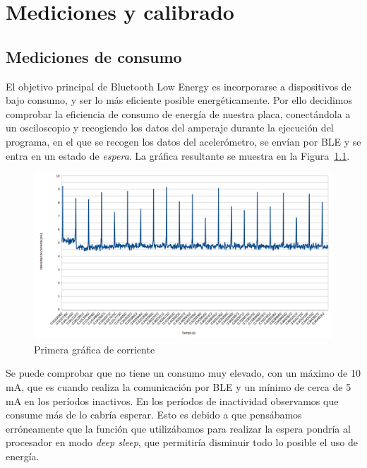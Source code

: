 \cleardoublepage

\chapter{Mediciones y calibrado}
\label{makereference7}

\section{Mediciones de consumo}

El objetivo principal de Bluetooth Low Energy es incorporarse a dispositivos de bajo consumo, y ser lo más eficiente posible energéticamente. Por ello decidimos comprobar la eficiencia de consumo de energía de nuestra placa, conectándola a un osciloscopio y recogiendo los datos del amperaje durante la ejecución del programa, en el que se recogen los datos del acelerómetro, se envían por BLE y se entra en un estado de \textit{espera}. La gráfica resultante se muestra en la Figura~\ref{figuraConsumoMayo}.

\begin{figure}[h]%
	\centering
    \includegraphics[width=\textwidth]{figures/consumo_mayo2.png}
    \caption[Primera gráfica de corriente]{Primera gráfica de corriente}
   	\label{figuraConsumoMayo}
\end{figure}

Se puede comprobar que no tiene un consumo muy elevado, con un máximo de 10 mA, que es cuando realiza la comunicación por BLE y un mínimo de cerca de 5 mA en los períodos inactivos. En los períodos de inactividad observamos que consume más de lo cabría esperar. Esto es debido a que pensábamos erróneamente que la función que utilizábamos para realizar la espera pondría al procesador en modo \textit{deep sleep}, que permitiría disminuir todo lo posible el uso de energía.

